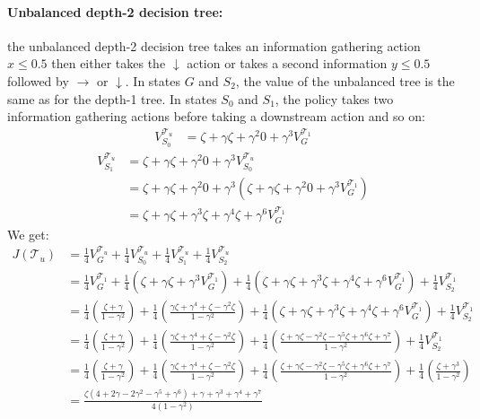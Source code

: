 \paragraph{Unbalanced depth-2 decision tree:}the unbalanced depth-2 decision tree  takes an information gathering action $x\leq0.5$ then either takes the $\downarrow$ action or takes a second information $y\leq0.5$ followed by $\rightarrow$ or $\downarrow$.
In states $G$ and $S_2$, the value of the unbalanced tree is the same as for the depth-1 tree.
In states $S_0$ and $S_1$, the policy takes two information gathering actions before taking a downstream action and so on:
\begin{align*}
    V^{\mathcal{T}_{u}}_{S_0} &= \zeta + \gamma \zeta + \gamma ^ 2 0 + \gamma ^ 3 V^{\mathcal{T}_1}_G
\end{align*} 
\begin{align*}
    V^{\mathcal{T}_{u}}_{S_1} &= \zeta + \gamma \zeta + \gamma ^ 2 0 + \gamma ^ 3 V^{\mathcal{T}_u}_{S_0} \\ 
    &= \zeta + \gamma \zeta + \gamma ^ 2 0 + \gamma ^ 3 (\zeta + \gamma \zeta + \gamma ^ 2 0 + \gamma ^ 3 V^{\mathcal{T}_1}_G) \\
    &= \zeta + \gamma \zeta + \gamma ^ 3 \zeta + \gamma ^ 4 \zeta + \gamma ^ 6 V^{\mathcal{T}_1}_G
\end{align*}
We get:
\begin{align*}
    J(\mathcal{T}_{u}) &= \frac{1}{4} V^{\mathcal{T}_u}_G + \frac{1}{4} V^{\mathcal{T}_u}_{S_0} + \frac{1}{4}V^{\mathcal{T}_u}_{S_1} + \frac{1}{4}V^{\mathcal{T}_u}_{S_2} \\
    &=  \frac{1}{4} V^{\mathcal{T}_1}_G + \frac{1}{4}(\zeta + \gamma \zeta + \gamma ^ 3 V^{\mathcal{T}_1}_G) + \frac{1}{4} (\zeta + \gamma \zeta + \gamma ^ 3 \zeta + \gamma ^ 4 \zeta + \gamma ^ 6 V^{\mathcal{T}_1}_G) + \frac{1}{4}V^{\mathcal{T}_1}_{S_2} \\
    &= \frac{1}{4} (\frac{\zeta + \gamma}{1-\gamma^2}) + \frac{1}{4}(\frac{\gamma\zeta + \gamma^4 + \zeta -\gamma^2\zeta}{1-\gamma^2}) + \frac{1}{4} (\zeta + \gamma \zeta + \gamma ^ 3 \zeta + \gamma ^ 4 \zeta + \gamma ^ 6 V^{\mathcal{T}_1}_G) + \frac{1}{4}V^{\mathcal{T}_1}_{S_2} \\
    &= \frac{1}{4} (\frac{\zeta + \gamma}{1-\gamma^2}) + \frac{1}{4}(\frac{\gamma\zeta + \gamma^4 + \zeta -\gamma^2\zeta}{1-\gamma^2}) + \frac{1}{4} (\frac{\zeta + \gamma\zeta -\gamma^2\zeta-\gamma^5\zeta+\gamma^6\zeta+\gamma^7}{1-\gamma^2}) + \frac{1}{4}V^{\mathcal{T}_1}_{S_2} \\
    &= \frac{1}{4} (\frac{\zeta + \gamma}{1-\gamma^2}) + \frac{1}{4}(\frac{\gamma\zeta + \gamma^4 + \zeta -\gamma^2\zeta}{1-\gamma^2}) + \frac{1}{4} (\frac{\zeta + \gamma\zeta -\gamma^2\zeta-\gamma^5\zeta+\gamma^6\zeta+\gamma^7}{1-\gamma^2}) + \frac{1}{4}(\frac{\zeta + \gamma ^ 3}{1-\gamma^2}) \\
    &= \frac{\zeta(4+2\gamma-2\gamma^2-\gamma^5+\gamma^6)+\gamma+\gamma^3+\gamma^4+\gamma^7}{4(1-\gamma^2)}
\end{align*}
